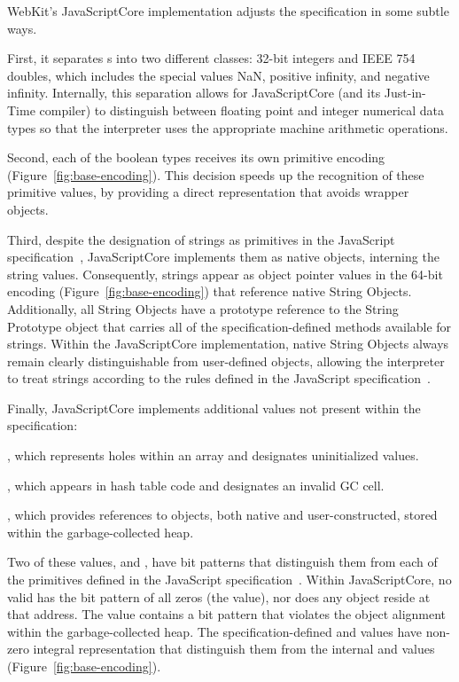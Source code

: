 WebKit's JavaScriptCore implementation adjusts the specification in some subtle ways.

First, it separates s into two different classes: 32-bit integers and IEEE 754 doubles, which includes the special values NaN, positive infinity, and negative infinity.
Internally, this separation allows for JavaScriptCore (and its Just-in-Time compiler) to distinguish between floating point and integer numerical data types so that the interpreter uses the appropriate machine arithmetic operations.

Second, each of the boolean types receives its own primitive encoding (Figure~\ref{fig:base-encoding}).
This decision speeds up the recognition of these primitive values, by providing a direct representation that avoids wrapper objects.

Third, despite the designation of strings as primitives in the JavaScript specification~\cite{ecma}, JavaScriptCore implements them as native objects, interning the string values.
Consequently, strings appear as object pointer values in the  64-bit encoding (Figure~\ref{fig:base-encoding}) that reference native String Objects.
Additionally, all String Objects have a prototype reference to the String Prototype object that carries all of the specification-defined methods available for strings.
Within the JavaScriptCore implementation, native String Objects always remain clearly distinguishable from user-defined objects, allowing the interpreter to treat strings according to the rules defined in the JavaScript specification~\cite{ecma}.

Finally, JavaScriptCore implements additional values not present within the specification:
\begin{description}
  \item \textbf{}, which represents holes within an array and designates uninitialized values.
  \item \textbf{}, which appears in hash table code and designates an invalid GC cell.
  \item \textbf{}, which provides references to objects, both native and user-constructed, stored within the garbage-collected heap.
\end{description}

Two of these values,  and , have bit patterns that distinguish them from each of the primitives defined in the JavaScript specification~\cite{ecma}.
Within JavaScriptCore, no valid  has the bit pattern of all zeros (the  value), nor does any object reside at that address.
The  value contains a bit pattern that violates the object alignment within the garbage-collected heap.
The specification-defined  and  values have non-zero integral representation that distinguish them from the internal  and  values (Figure~\ref{fig:base-encoding}).

